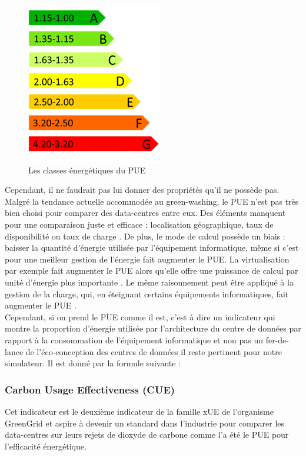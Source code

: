 \begin{figure}[h]
	\begin{center}
		\includegraphics[scale=0.6]{partie2/images/classeEnergetique.png}
	\end{center}
	\caption{Les classes énergétiques du PUE}
\end{figure}
\newpage
Cependant, il ne faudrait pas lui donner des propriétés qu'il ne possède pas. Malgré la tendance actuelle accommodée au green-washing, le PUE n'est pas très bien choisi pour comparer des data-centres entre eux. Des éléments manquent pour une comparaison juste et efficace : localisation géographique, taux de disponibilité ou taux de charge \cite{badPUEOtherMetrics}. De plus, le mode de calcul possède un biais : baisser la quantité d'énergie utilisée par l'équipement informatique, même si c'est pour une meilleur gestion de l'énergie fait augmenter le PUE. La virtualisation par exemple fait augmenter le PUE alors qu'elle offre une puissance de calcul par unité d'énergie plus importante \cite{badPUEVirtualisation}. Le même raisonnement peut être appliqué à la gestion de la charge, qui, en éteignant certains équipements informatiques, fait augmenter le PUE \cite{badPUECharge}.\\

Cependant, si on prend le PUE comme il est, c'est à dire un indicateur qui montre la proportion d'énergie utilisée par l'architecture du centre de données par rapport à la consommation de l'équipement informatique et non pas un fer-de-lance de l'éco-conception des centres de données il reste pertinent pour notre simulateur. Il est donné par la formule suivante :

\subsubsection{Carbon Usage Effectiveness (CUE)}
Cet indicateur est le deuxième indicateur de la famille xUE de l'organisme GreenGrid et aspire à devenir un standard dans l'industrie pour comparer les data-centres sur leurs rejets de dioxyde de carbone comme l'a été le PUE pour l'efficacité énergétique.

